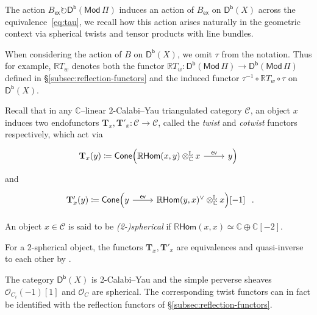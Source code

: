 \documentclass[reqno,a4paper]{amsart}
\newcommand{\C}{\mathbb{C}}
\newcommand{\LL}{\mathbb{L}}
\newcommand{\R}{\mathbb{R}}
\newcommand{\scrC}{\mathscr{C}}
\newcommand{\scrO}{\mathscr{O}}
\newcommand{\bfT}{\mathbf{T}}
\newcommand{\catMod}{\mathsf{Mod}}
\newcommand{\ModPi}{\catMod\, \Pi}
\newcommand{\catDb}{\mathsf{D}^\mathsf{b}}
\newcommand{\sfex}{\mathsf{ex}}
\newcommand{\rsv}{X}
\newcommand{\ev}{\mathsf{ev}}
\newcommand{\Hom}{\mathsf{Hom}}
\theoremstyle{basic-theorem}
\numberwithin{equation}{section}
\begin{document}
The action $B_\sfex\circlearrowright \catDb(\ModPi)$ induces an action of $B_\sfex$ on $\catDb(\rsv)$ across the equivalence~\eqref{eq:tau}, we recall how this action arises naturally in the geometric context via spherical twists and tensor products with line bundles.

\begin{notation}
    When considering the action of $B$ on $\catDb(\rsv)$, we omit $\tau$ from the notation. Thus for example, $\R T_w$ denotes both the functor $\R T_w\colon \catDb(\ModPi)\to \catDb(\ModPi)$ defined in \S\ref{subsec:reflection-functors} and the induced functor $\tau^{-1}\circ \R T_w \circ \tau$ on $\catDb(\rsv)$.
\end{notation}

Recall that in any $\C$--linear $2$-Calabi--Yau triangulated category $\scrC$, an object $x$ induces two endofunctors $\bfT_x,\bfT'_x\colon\scrC\to\scrC$, called the \textit{twist} and \textit{cotwist} functors respectively, which act via
\begin{align}
	\begin{tikzcd}[ampersand replacement=\&]
		\bfT_x(y) \coloneqq \mathsf{Cone}\Big( \R\Hom(x, y)\otimes^\LL_\C x \ar{r}{\quad\ev\quad} \& y\Big)
	\end{tikzcd}
\end{align}
and
\begin{align}
	\begin{tikzcd}[ampersand replacement=\&]
		\bfT'_x(y) \coloneqq \mathsf{Cone}\Big(y  \ar{r}{\quad\ev\quad} \& \R\Hom(y,x)^\vee \otimes^\LL_\C x\Big)[-1]
	\end{tikzcd}\ .
\end{align}

\begin{definition}
	An object $x\in \scrC$ is said to be \textit{(2-)spherical} if $\R \Hom(x,x)\simeq\C\oplus\C[-2]$.
\end{definition}

\begin{remark}
	For a 2-spherical object, the functors $\bfT_x, \bfT'_x$ are equivalences and quasi-inverse to each other by \cite[Proposition~2.10]{ST01}.
\end{remark}

The category $\catDb(\rsv)$ is 2-Calabi--Yau and the simple perverse sheaves $\scrO_{C_i}(-1)[1]$ and $\scrO_C$ are spherical. The corresponding twist functors can in fact be identified with the reflection functors of \S\ref{subsec:reflection-functors}.
\end{document}
